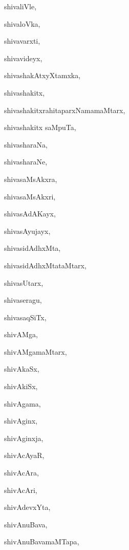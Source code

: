 \begin{multicols}{2}
{shivaliVle}, \pageref{shivaliVle}

{shivaloVka}, \pageref{shivaloVka}

{shivavarxti}, \pageref{shivavarxti}

{shivavideyx}, \pageref{shivavideyx}

{shivashakAtxyXtamxka}, \pageref{shivashakAtxyXtamxka}

{shivashakitx}, \pageref{shivashakitx}

{shivashakitxrahitaparxNamamaMtarx}, \pageref{shivashakitxrahitaparxNamamaMtarx}

{shivashakitx saMpuTa}, \pageref{shivashakitxsaMpuTa}

{shivasharaNa}, \pageref{shivasharaNa}

{shivasharaNe}, \pageref{shivasharaNe}

{shivasaMsAkxra}, \pageref{shivasaMsAkxra}

{shivasaMsAkxri}, \pageref{shivasaMsAkxri}

{shivasAdAKayx}, \pageref{shivasAdAKayx}

{shivasAyujayx}, \pageref{shivasAyujayx}

{shivasidAdhxMta}, \pageref{shivasidAdhxMta}

{shivasidAdhxMtataMtarx}, \pageref{shivasidAdhxMtataMtarx}

{shivasUtarx}, \pageref{shivasUtarx}

{shivaseragu}, \pageref{shivaseragu}

{shivasaqSiTx}, \pageref{shivasaqSiTx}

{shivAMga}, \pageref{shivAMga}

{shivAMgamaMtarx}, \pageref{shivAMgamaMtarx}

{shivAkaSx}, \pageref{shivAkaSx}

{shivAkiSx}, \pageref{shivAkiSx}

{shivAgama}, \pageref{shivAgama}

{shivAginx}, \pageref{shivAginx}

{shivAginxja}, \pageref{shivAginxja}

{shivAcAyaR}, \pageref{shivAcAyaR}

{shivAcAra}, \pageref{shivAcAra}

{shivAcAri}, \pageref{shivAcAri}

{shivAdevxYta}, \pageref{shivAdevxYta}

{shivAnuBava}, \pageref{shivAnuBava}

{shivAnuBavamaMTapa}, \pageref{shivAnuBavamaMTapa}


\end{multicols}

